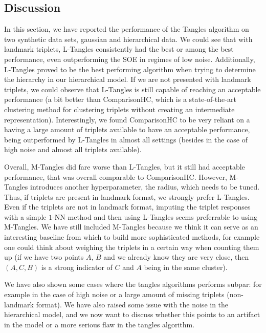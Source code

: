 \subsection{Discussion}
In this section, we have reported the performance of the Tangles algorithm on two synthetic data sets, gaussian and hierarchical data. 
We could see that with landmark triplets, L-Tangles consistently had the best or among the best performance, even outperforming the 
SOE in regimes of low noise. Additionally, L-Tangles proved to be the best performing algorithm when 
trying to determine the hierarchy in our hierarchical model.  If we are not presented with landmark triplets, we could observe that L-Tangles is still capable of reaching 
an acceptable performance (a bit better than ComparisonHC, which is a state-of-the-art clustering method for clustering triplets without creating an intermediate representation). Interestingly, we found ComparisonHC to be very reliant on a having a large amount of triplets available to have an acceptable performance, being outperformed by L-Tangles in almost all settings (besides in the case of high noise and almost
all triplets available).

Overall, M-Tangles did fare worse than L-Tangles, but it still had acceptable performance, that was overall comparable to ComparisonHC. However, M-Tangles introduces another hyperparameter, 
the radius, which needs to be tuned. Thus, if triplets are present in landmark format, we strongly prefer L-Tangles. Even if the triplets are not in landmark format, imputing the triplet responses
with a simple $1$-NN method and then using L-Tangles seems preferrable to using M-Tangles. We have still included M-Tangles because we think it can serve as an interesting 
baseline from which to build more sophisticated methods, for example one could think about weighing the triplets in a certain way when counting them up (if we have two points $A$, $B$ and we already know
they are very close, then $(A, C, B)$ is a strong indicator of $C$ and $A$ being in the same cluster). 

We have also shown some cases where the tangles algorithms performs subpar: for example in the case of high noise or a large amount of missing triplets (non-landmark format).
We have also raised some issue with the noise in the hierarchical model, and we now want to discuss whether this points to an artifact in the model or a more serious flaw in the tangles
algorithm.

